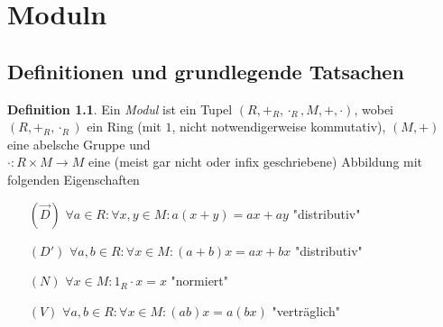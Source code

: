 \documentclass[
twoside=semi,
fontsize=12,
DIV=12, 
cleardoublepage=current,
leqno,
headings=optiontoheadandtoc, 
toc=idx
]{scrbook}
\theoremstyle{definition}
\newtheorem{definition}{Definition}[section]
\begin{document}
	\tableofcontents\thispagestyle{empty}
	\newpage\thispagestyle{empty}
	\mainmatter
	\chapter[tocentry={Moduln}]{Moduln}
	\pagestyle{main}
	
	\section{Definitionen und grundlegende Tatsachen}
	\begin{definition}\label{1.1.1}\hfill\newline
		Ein \emph{Modul} ist ein Tupel $(R, +_R, \cdot_R, M, +, \cdot)$, wobei $(R, +_R, \cdot_R)$ ein Ring (mit $1$, nicht notwendigerweise kommutativ), $(M, +)$ eine abelsche Gruppe und \\\noindent$\cdot:R\times M \to M$ eine (meist gar nicht oder infix geschriebene) Abbildung mit folgenden Eigenschaften
		
		\begin{itemize}
			\item[$(\overset{\rightarrow}{D})$] $\forall a \in R: \forall x, y \in M: a(x + y) = ax + ay$ \hfill "distributiv"
			
			\item[$(D')$] $\forall a, b \in R: \forall x \in M: (a+b)x = ax + bx$ \hfill "distributiv"
			
			\item[$(N)$] $\forall x \in M: 1_R \cdot x = x$ \hfill "normiert"
			
			\item[$(V)$] $\forall a, b \in R: \forall x \in M: (ab)x = a(bx)$ \hfill "vertr\"aglich"
		\end{itemize}
	\end{definition}
	
\end{document}
